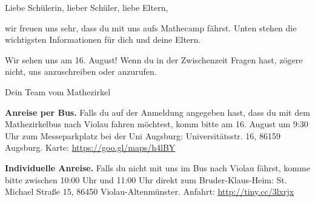 \documentclass[12pt]{zettel}
\begin{document}
\renewcommand{\betreff}{Mathecamp des Matheschülerzirkels Augsburg}

\makeletterhead{}
\vspace{-2em}

Liebe Schülerin, lieber Schüler, liebe Eltern,

wir freuen uns sehr, dass du mit uns aufs Mathecamp
fährst. Unten stehen die wichtigsten Informationen für dich und deine Eltern.




Wir sehen uns am 16. August! Wenn du in der Zwischenzeit Fragen hast, zögere
nicht, uns anzuschreiben oder anzurufen.

\vspace{1em}

Dein Team vom Mathezirkel

\vspace{1em}



\begin{shaded}
\textbf{Anreise per Bus.} Falls du auf der Anmeldung angegeben hast, dass du mit dem
Mathezirkelbus nach Violau fahren möchtest, komm bitte am 16. August um
9:30 Uhr zum Messeparkplatz bei der Uni Augsburg: Universitätsstr. 16, 86159
Augsburg. Karte: \url{https://goo.gl/maps/h4lBY}

\textbf{Individuelle Anreise.} Falls du nicht mit uns im Bus nach Violau fährst, komme bitte
zwischen 10:00 Uhr und 11:00 Uhr direkt zum Bruder-Klaus-Heim:
St. Michael Straße 15, 86450 Violau-Altenmünster. Anfahrt:
\url{http://tiny.cc/3lxrjx}
\end{shaded}
\end{document}
